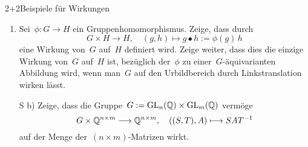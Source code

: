 \documentclass{algblatt}
\begin{document}
\begin{aufgabe}{2+2}{Beispiele für Wirkungen}
\begin{enumerate}
\item Sei~$\phi : G \to H$ ein Gruppenhomomorphismus. Zeige, dass durch
\[ G \times H \longrightarrow H, \quad (g,h) \longmapsto g \bullet h := \phi(g)\,h
\]
eine Wirkung von~$G$ auf~$H$ definiert wird. Zeige weiter, dass dies die
einzige Wirkung von~$G$ auf~$H$ ist, bezüglich der~$\phi$ zu
einer~$G$-äquivarianten Abbildung wird, wenn man~$G$ auf den Urbildbereich durch
Linkstranslation wirken lässt.
\item[S b)] Zeige, dass die Gruppe~$G := \mathrm{GL}_n(\mathbb{Q}) \times \mathrm{GL}_m(\mathbb{Q})$ vermöge
\[ G \times \mathbb{Q}^{n \times m} \longrightarrow \mathbb{Q}^{n \times m}, \quad
  ((S,T), A) \longmapsto SAT^{-1} \]
auf der Menge der~$(n \times m)$-Matrizen wirkt.
\end{enumerate}
\end{aufgabe}
\end{document}

